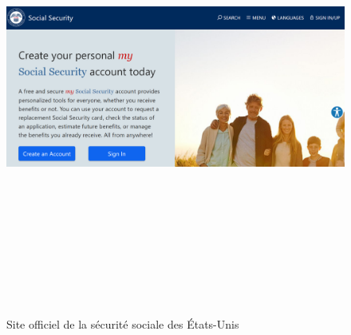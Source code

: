 \begin{figure}[!h]
  \centering
\includegraphics[width=15cm,height=15cm,keepaspectratio]{figure/socity site of america.PNG}
  \caption{Site officiel de la sécurité sociale des États-Unis}
\end{figure}
